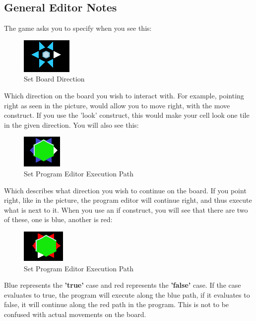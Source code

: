 \subsection{General Editor Notes}

The game asks you to specify when you see this:

\begin{figure}[h]
	\centering
		\includegraphics{img/SetDirection.png}
	\caption{Set Board Direction}
	\label{fig:SetDirection}
\end{figure}

Which direction on the board you wish to interact with. For example, pointing right as seen in the picture, would allow you to move right, with the move construct. If you use the 'look' construct, this would make your cell look one tile in the given direction. You will also see this:

\begin{figure}[h]
	\centering
		\includegraphics{img/Setprogramexecution.png}
	\caption{Set Program Editor Execution Path}
	\label{fig:Setprogramexecution}
\end{figure}

Which describes what direction you wish to continue on the board. If you point right, like in the picture, the program editor will continue right, and thus execute what is next to it. When you use an if construct, you will see that there are two of these, one is blue, another is red:


\begin{figure}[h]
	\centering
		\includegraphics{img/setprogramexecutionfalse.png}
	\caption{Set Program Editor Execution Path}
	\label{fig:setprogramexecutionfalse}
\end{figure}

Blue represents the \textbf{'true'} case and red represents the \textbf{'false'} case. If the case evaluates to true, the program will execute along the blue path, if it evaluates to false, it will continue along the red path in the program. This is not to be confused with actual movements on the board.

